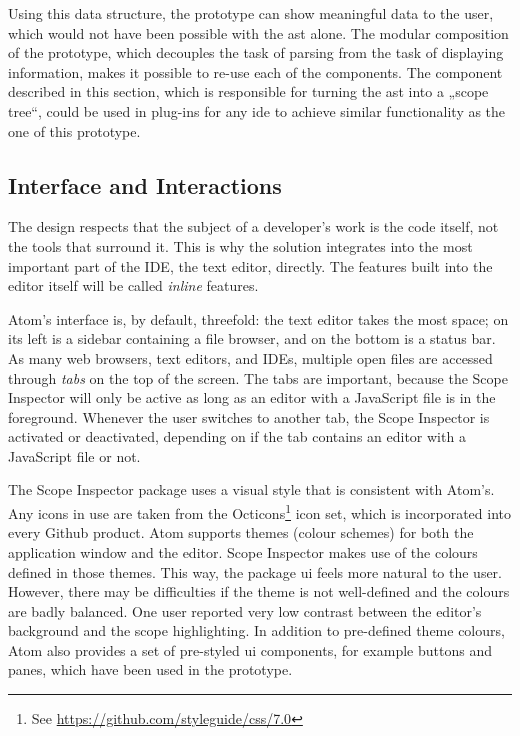 Using this data structure, the prototype can show meaningful data to the
user, which would not have been possible with the \ac{ast} alone. The
modular composition of the prototype, which decouples the task of
parsing from the task of displaying information, makes it possible to
re-use each of the components. The component described in this section,
which is responsible for turning the \ac{ast} into a „scope tree“, could
be used in plug-ins for any \ac{ide} to achieve similar functionality as
the one of this prototype.

\subsection{Interface and
Interactions}\label{interface-and-interactions}

The design respects that the subject of a developer’s work is the code
itself, not the tools that surround it. This is why the solution
integrates into the most important part of the IDE, the text editor,
directly. The features built into the editor itself will be called
\emph{inline} features.

Atom’s interface is, by default, threefold: the text editor takes the
most space; on its left is a sidebar containing a file browser, and on
the bottom is a status bar. As many web browsers, text editors, and
IDEs, multiple open files are accessed through \emph{tabs} on the top of
the screen. The tabs are important, because the Scope Inspector will
only be active as long as an editor with a JavaScript file is in the
foreground. Whenever the user switches to another tab, the Scope
Inspector is activated or deactivated, depending on if the tab contains
an editor with a JavaScript file or not.

The Scope Inspector package uses a visual style that is consistent with
Atom’s. Any icons in use are taken from the
Octicons\footnote{See \url{https://github.com/styleguide/css/7.0}} icon
set, which is incorporated into every Github product. Atom supports
themes (colour schemes) for both the application window and the editor.
Scope Inspector makes use of the colours defined in those themes. This
way, the package \ac{ui} feels more natural to the user. However, there
may be difficulties if the theme is not well-defined and the colours are
badly balanced. One user reported very low contrast between the editor’s
background and the scope highlighting. In addition to pre-defined theme
colours, Atom also provides a set of pre-styled \ac{ui} components, for
example buttons and panes, which have been used in the prototype.

